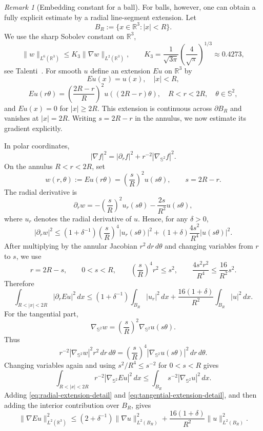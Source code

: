 \documentclass[11pt]{article}
\theoremstyle{plain}
\theoremstyle{definition}
\theoremstyle{remark}
\newtheorem{remark}{Remark}
\begin{document}
\begin{remark}[Embedding constant for a ball]
\label{rmk:c6-ball}
For balls, however, one can obtain a fully explicit estimate by a
radial line-segment extension.  Let
\[
  B_R:=\{x\in\mathbb R^3: |x|<R\}.
\]
We use the sharp Sobolev constant on \(\mathbb R^3\),
\begin{equation}
\label{eq:K3-talenti-correct}
  \|w\|_{L^6(\mathbb R^3)}
  \le K_3\|\nabla w\|_{L^2(\mathbb R^3)},
  \qquad
  K_3
  =
  \frac{1}{\sqrt{3\pi}}
  \left(\frac{4}{\sqrt{\pi}}\right)^{1/3}
  \approx 0.4273 ,
\end{equation}
see Talenti~\cite{Talenti1976}.
For smooth $u$ define an extension $Eu$ on $\mathbb R^3$ by
\[
  Eu(x)=u(x),\quad |x|<R,
\]
\[
  Eu(r\theta)=\left(\frac{2R-r}{R}\right)^2u((2R-r)\theta),
  \quad R<r<2R,\quad \theta\in\mathbb S^2,
\]
and $Eu(x)=0$ for $|x|\ge 2R$.  This extension is continuous across
$\partial B_R$ and vanishes at $|x|=2R$.  Writing $s=2R-r$ in the annulus,
we now estimate its gradient explicitly.

In polar coordinates,
\[
  |\nabla f|^2 = |\partial_r f|^2+r^{-2}|\nabla_{\mathbb S^2}f|^2 .
\]
On the annulus $R<r<2R$, set
\[
  w(r,\theta):=Eu(r\theta)=\left(\frac{s}{R}\right)^2u(s\theta),
  \qquad s=2R-r .
\]
The radial derivative is
\[
  \partial_r w
  =
  -\left(\frac{s}{R}\right)^2 u_r(s\theta)
  -\frac{2s}{R^2}u(s\theta),
\]
where $u_r$ denotes the radial derivative of $u$.  Hence, for any
$\delta>0$,
\[
  |\partial_r w|^2
  \le
  (1+\delta^{-1})\left(\frac{s}{R}\right)^4 |u_r(s\theta)|^2
  +(1+\delta)\frac{4s^2}{R^4}|u(s\theta)|^2 .
\]
After multiplying by the annular Jacobian $r^2\,dr\,d\theta$ and changing
variables from $r$ to $s$, we use
\[
  r=2R-s,\qquad 0<s<R,\qquad
  \left(\frac{s}{R}\right)^4r^2\le s^2,\qquad
  \frac{4s^2r^2}{R^4}\le \frac{16}{R^2}s^2 .
\]
Therefore
\begin{equation}
\label{eq:radial-extension-detail}
  \int_{R<|x|<2R} |\partial_r Eu|^2\,dx
  \le
  (1+\delta^{-1})\int_{B_R}|u_r|^2\,dx
  +
  \frac{16(1+\delta)}{R^2}\int_{B_R}|u|^2\,dx .
\end{equation}
For the tangential part,
\[
  \nabla_{\mathbb S^2}w
  =
  \left(\frac{s}{R}\right)^2\nabla_{\mathbb S^2}u(s\theta).
\]
Thus
\[
  r^{-2}|\nabla_{\mathbb S^2}w|^2 r^2\,dr\,d\theta
  =
  \left(\frac{s}{R}\right)^4
  |\nabla_{\mathbb S^2}u(s\theta)|^2\,dr\,d\theta .
\]
Changing variables again and using $s^2/R^4\le s^{-2}$ for $0<s<R$ gives
\begin{equation}
\label{eq:tangential-extension-detail}
  \int_{R<|x|<2R} r^{-2}|\nabla_{\mathbb S^2}Eu|^2\,dx
  \le
  \int_{B_R}s^{-2}|\nabla_{\mathbb S^2}u|^2\,dx .
\end{equation}
Adding \eqref{eq:radial-extension-detail} and
\eqref{eq:tangential-extension-detail}, and then adding the interior
contribution over $B_R$, gives
\begin{equation}
\label{eq:ball-extension-gradient}
  \|\nabla Eu\|_{L^2(\mathbb R^3)}^2
  \le
  \left(2+\delta^{-1}\right)\|\nabla u\|_{L^2(B_R)}^2
  +
  \frac{16(1+\delta)}{R^2}\|u\|_{L^2(B_R)}^2 .
\end{equation}


\end{remark}
\end{document}
